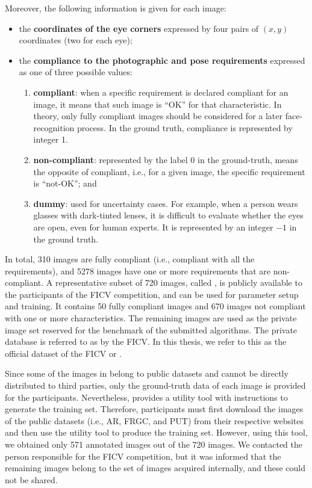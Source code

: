 Moreover, the following information is given for each image:
 
\begin{itemize}
\item the \textbf{coordinates of the eye corners} expressed by four pairs of $(x, y)$ coordinates (two for each eye);
\item the \textbf{compliance to the photographic and pose requirements} expressed as one of three possible values: 
 \begin{enumerate}[i]
 \item \textbf{compliant}: when a specific requirement is declared compliant for an image, it means that such image is ``OK'' for that characteristic. In theory, only fully compliant images should be considered for a later face-recognition process. In the ground truth, compliance is represented by integer 1.
 \item \textbf{non-compliant}: represented by the label 0 in the ground-truth, means the opposite of compliant, i.e., for a given image, the specific requirement is ``not-OK''; and
 \item \textbf{dummy}: used for uncertainty cases. For example, when a person wears glasses with dark-tinted lenses, it is difficult to evaluate whether the eyes are open, even for human experts. It is represented by an integer $-1$ in the ground truth.
 \end{enumerate}
\end{itemize}
 
In total, 310 images are fully compliant (i.e., compliant with all the requirements), and 5278 images have one or more requirements that are non-compliant. A representative subset of 720 images, called \ficvtest, is publicly available to the participants of the FICV competition, and can be used for parameter setup and training. It contains 50 fully compliant images and 670 images not compliant with one or more characteristics. The remaining images are used as the private image set reserved for the benchmark of the submitted algorithms. The private database is referred to as \ficvofficial by the FICV. In this thesis, we refer to this as the official dataset of the FICV or \fvcongoing. 
 
Since some of the images in \ficvtest belong to public datasets and cannot be directly distributed to third parties, only the ground-truth data of each image is provided for the participants. Nevertheless, \fvcongoing provides a utility tool with instructions to generate the training set. Therefore, participants must first download the images of the public datasets (i.e., AR, FRGC, and PUT) from their respective websites and then use the utility tool to produce the training set. However, using this tool, we obtained only 571 annotated images out of the 720 images. We contacted the person responsible for the FICV competition, but it was informed that the remaining images belong to the set of images acquired internally, and these could not be shared.
 
